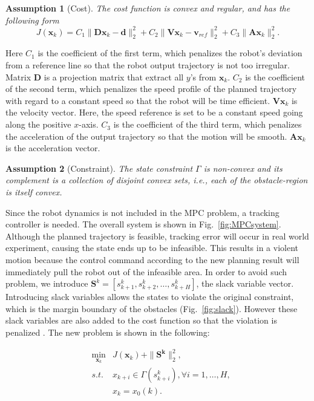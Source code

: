 \documentclass[letterpaper, 10 pt, conference]{ieeeconf}  %
\newtheorem{assumption}{\textbf{Assumption}}
\begin{document}
\begin{assumption}[Cost]
\textit{The cost function is convex and regular, and has the following form}
\begin{equation}
J(\mathbf{x}_k) = C_1\|\mathbf{D}\mathbf{x}_k-\mathbf{d}\|_{2}^2 + C_2 \|\mathbf{V}\mathbf{x}_k-\mathbf{v}_{ref}\|_2^2 +C_3\|\mathbf{A}\mathbf{x}_{k}\|_2^2.  
\end{equation}
\end{assumption}
Here $C_1$ is the coefficient of the first term, which penalizes the robot's deviation from a reference line so that the robot output trajectory is not too irregular. Matrix $\mathbf{D}$ is a projection matrix that extract all $y$'s from $\mathbf{x}_k$. $C_2$ is the coefficient of the second term, which penalizes the speed profile of the planned trajectory with regard to a constant speed so that the robot will be time efficient. $\mathbf{V}\mathbf{x}_k$ is the velocity vector. Here, the speed reference is set to be a constant speed going along the positive $x$-axis. $C_3$ is the coefficient of the third term, which penalizes the acceleration of the output trajectory so that the motion will be smooth. $\mathbf{A}\mathbf{x}_{k}$ is the acceleration vector.

\begin{assumption}[Constraint]
\textit{The state constraint $\Gamma$ is non-convex and its complement is a collection of disjoint convex sets, i.e., each of the obstacle-region is itself convex.}
\end{assumption}

Since the robot dynamics is not included in the MPC problem, a tracking controller is needed. The overall system is shown in Fig.~\ref{fig:MPCsystem}. Although the planned trajectory  is feasible, tracking error will occur in real world experiment, causing the state ends up to be infeasible. This results in a violent motion because the control command according to the new planning result will immediately pull the robot out of the infeasible area. In order to avoid such problem, we introduce  $\mathbf{S}^k = [s^k_{k+1},s^k_{k+2},\ldots,s^k_{k+H}]$, the slack variable vector. Introducing slack variables allows the states to violate the original constraint, which is the margin boundary of the obstacles (Fig.~\ref{fig:slack}). However these slack variables are also added to the cost function so that the violation is penalized \cite{chen2018foad}. The new problem is shown in the following:

\begin{eqnarray}
&\min_{\mathbf{x}_{k}} & J(\mathbf{x}_k) + \|\mathbf{S^k}\|_{2}^2 ,\\
&s.t.& x_{k+i} \in\Gamma(s^k_{k+i}),\forall i=1,\ldots,H,\\
&&         x_{k}=x_0(k).
\end{eqnarray} 
\end{document}
